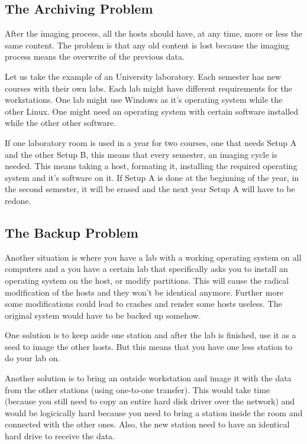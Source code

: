 \subsection{The Archiving Problem}

After the imaging process, all the hosts should have, at any time, more or
less the same content. The problem is that any old content is lost because
the imaging process means the overwrite of the previous data.

Let us take the example of an University laboratory. Each semester has new
courses with their own labs. Each lab might have different requirements for
the workstations. One lab might use Windows as it's operating system while
the other Linux. One might need an operating system with certain software 
installed while the other other software.

If one laboratory room is used in a year for two courses, one that needs
Setup A and the other Setup B, this means that every semester, an imaging
cycle is needed. This means taking a host, formating it, installing the
required operating system and it's software on it. If Setup A is done at
the beginning of the year, in the second semester, it will be erased and
the next year Setup A will have to be redone.

\subsection{The Backup Problem}

Another situation is where you have a lab with a working operating system
on all computers and a you have a certain lab that specifically asks you to
install an operating system on the host, or modify partitions. This will
cause the radical modification of the hosts and they won't be identical
anymore. Further more some modifications could lead to crashes and render
some hosts useless. The original system would have to be backed up somehow.

One solution is to keep aside one station and after the lab is finished,
use it as a seed to image the other hosts. But this means that you have one
less station to do your lab on.


Another solution is to bring an outside workstation and image it with the
data from the other stations (using one-to-one transfer). This would take
time (because you still need to copy an entire hard disk driver over the
network) and would be logicically hard because you need to bring a station
inside the room and connected with the other ones. Also, the new station
need to have an identical hard drive to receive the data.


